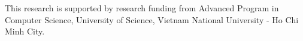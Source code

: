 %
%
%
%
%
%
%






\appendix
%
\begin{acks}
This research is supported by research funding from Advanced Program in
Computer Science, University of Science, Vietnam National University - Ho Chi
Minh City.
\end{acks}

